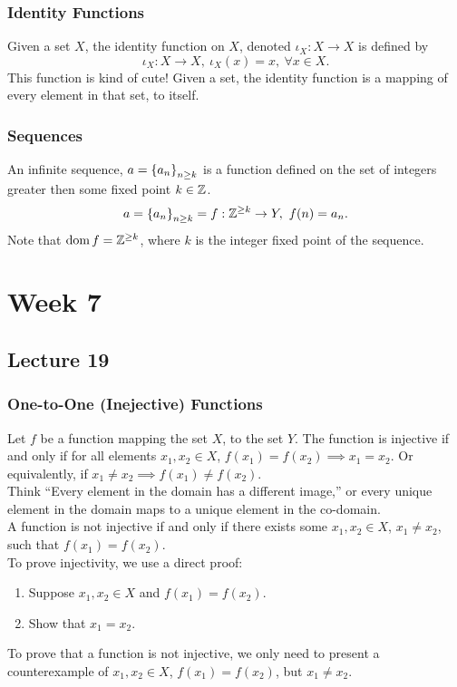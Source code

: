 \documentclass{report}
\begin{document}
\subsection*{Identity Functions}
Given a set $X$, the identity function on $X$, denoted $\iota_X:X\to X$ is defined by
$$
	\iota_X: X\to X,\ \iota_X(x) = x,\ \forall x\in X.
$$
This function is kind of cute! Given a set, the identity function is a mapping of every element in that set, to itself.

\subsection*{Sequences}
An infinite sequence, $a = \left\lbrace a_n \right\rbrace_{n\geq k}$ is a function defined on the set of integers greater then some fixed point $k\in\mathbb{Z}$.
$$
	a = \left\lbrace a_n \right\rbrace_{n\geq k} = f:\mathbb{Z}^{\geq k}\to Y,\ f(n) = a_n. 
$$
Note that $\operatorname{dom} f = \mathbb{Z}^{\geq k}$, where $k$ is the integer fixed point of the sequence.

\chapter{Week 7}
\section{Lecture 19}
\subsection*{One-to-One (Inejective) Functions}
Let $f$ be a function mapping the set $X$, to the set $Y$. The function is injective if and only if for all elements $x_1, x_2\in X$, $f(x_1) = f(x_2) \implies x_1 = x_2$. Or equivalently, if $x_1 \neq x_2 \implies f(x_1)\neq f(x_2)$. \\

Think ``Every element in the domain has a different image,'' or every unique element in the domain maps to a unique element in the co-domain. \\

A function is not injective if and only if there exists some $x_1, x_2\in X$, $x_1\neq x_2$, such that $f(x_1) = f(x_2)$. \\

To prove injectivity, we use a direct proof:
\begin{enumerate}
	\item Suppose $x_1,x_2\in X$ and $f(x_1) = f(x_2)$.
	\item Show that $x_1 = x_2$.
\end{enumerate}
To prove that a function is not injective, we only need to present a counterexample of $x_1,x_2\in X$, $f(x_1)=f(x_2)$, but $x_1 \neq x_2$.
\end{document}

